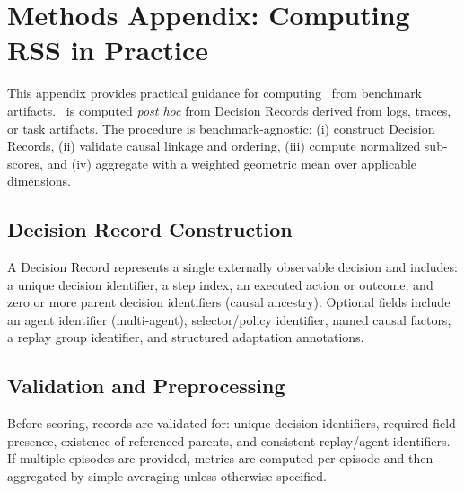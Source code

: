\section{Methods Appendix: Computing RSS in Practice}
\label{app:methods}

This appendix provides practical guidance for computing \RSS\ from benchmark artifacts. \RSS\ is computed \emph{post hoc} from Decision Records derived from logs, traces, or task artifacts. The procedure is benchmark-agnostic: (i) construct Decision Records, (ii) validate causal linkage and ordering, (iii) compute normalized sub-scores, and (iv) aggregate with a weighted geometric mean over applicable dimensions.

\subsection{Decision Record Construction}
A Decision Record represents a single externally observable decision and includes: a unique decision identifier, a step index, an executed action or outcome, and zero or more parent decision identifiers (causal ancestry). Optional fields include an agent identifier (multi-agent), selector/policy identifier, named causal factors, a replay group identifier, and structured adaptation annotations.

\subsection{Validation and Preprocessing}
Before scoring, records are validated for: unique decision identifiers, required field presence, existence of referenced parents, and consistent replay/agent identifiers. If multiple episodes are provided, metrics are computed per episode and then aggregated by simple averaging unless otherwise specified.
